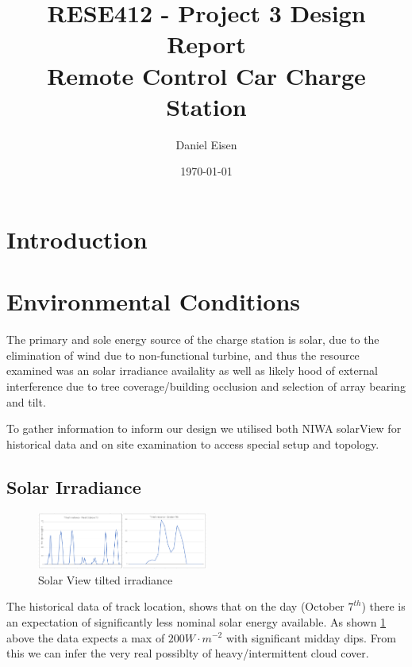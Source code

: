 \documentclass[11pt]{article}
\title{RESE412 - Project 3 Design Report \\ Remote Control Car Charge Station}
\author{Daniel Eisen}
\date{\today}
\begin{document}
\maketitle
\section{Introduction}


\section{Environmental Conditions}
The primary and sole energy source of the charge station is solar, due to the elimination of wind due to non-functional turbine, and thus the resource examined was an solar irradiance availality as well as likely hood of external interference due to tree coverage/building occlusion and selection of array bearing and tilt.

To gather information to inform our design we utilised both NIWA solarView \cite{solarview} for historical data and on site examination to access special setup and topology.

\subsection{Solar Irradiance}
\begin{figure}[h!]
    \begin{center}
        \includegraphics[width=0.5\textwidth]{inc/irr.png}
        \caption{Solar View tilted irradiance}
        \label{fig:solarview}
    \end{center}
\end{figure}

The historical data of track location, shows that on the day (October $7^{th}$) there is an expectation of significantly less nominal solar energy available. As shown \ref{fig:solarview} above the data expects a max of $200 W{\cdot}m^{-2}$ with significant midday dips. From this we can infer the very real possiblty of heavy/intermittent cloud cover.
\end{document}
